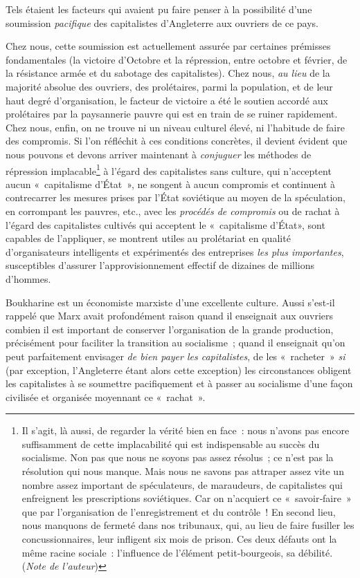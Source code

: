 \documentclass[french,twoside]{book} %
\begin{document}
\bigbreak
\noindent Tels étaient les facteurs qui avaient pu faire penser à la possibilité d’une soumission \emph{pacifique} des capitalistes d’Angleterre aux ouvriers de ce pays.\par
Chez nous, cette soumission est actuellement assurée par certaines prémisses fondamentales (la victoire d’Octobre et la répression, entre octobre et février, de la résistance armée et du sabotage des capitalistes). Chez nous, \emph{au lieu} de la majorité absolue des ouvriers, des prolétaires, parmi la population, et de leur haut degré d’organisation, le facteur de victoire a été le soutien accordé aux prolétaires par la paysannerie pauvre qui est en train de se ruiner rapidement. Chez nous, enfin, on ne trouve ni un niveau culturel élevé, ni l’habitude de faire des compromis. Si l’on réfléchit à ces conditions concrètes, il devient évident que nous pouvons et devons arriver maintenant à \emph{conjuguer} les méthodes de répression implacable\footnote{Il s’agit, là aussi, de regarder la vérité bien en face : nous n’avons pas encore suffisamment de cette implacabilité qui est indispensable au succès du socialisme. Non pas que nous ne soyons pas assez résolus ; ce n’est pas la résolution qui nous manque. Mais nous ne savons pas attraper assez vite un nombre assez important de spéculateurs, de maraudeurs, de capitalistes qui enfreignent les prescriptions soviétiques. Car on n’acquiert ce « savoir‑faire » que par l’organisation de l’enregistrement et du contrôle ! En second lieu, nous manquons de fermeté dans nos tribunaux, qui, au lieu de faire fusiller les concussionnaires, leur infligent six mois de prison. Ces deux défauts ont la même racine sociale : l’influence de l’élément petit‑bourgeois, sa débilité. (\emph{Note de l’auteur})} à l’égard des capitalistes sans culture, qui n’acceptent aucun « capitalisme d’État », ne songent à aucun compromis et continuent à contrecarrer les mesures prises par l’État soviétique au moyen de la spéculation, en corrompant les pauvres, etc., avec les \emph{procédés de compromis} ou de rachat à l’égard des capitalistes cultivés qui acceptent le « capitalisme d’État», sont capables de l’appliquer, se montrent utiles au prolétariat en qualité d’organisateurs intelligents et expérimentés des entreprises \emph{les plus importantes}, susceptibles d’assurer l’approvisionnement effectif de dizaines de millions d’hommes.\par
Boukharine est un économiste marxiste d’une excellente culture. Aussi s’est‑il rappelé que Marx avait profondément raison quand il enseignait aux ouvriers combien il est important de conserver l’organisation de la grande production, précisément pour faciliter la transition au socialisme ; quand il enseignait qu’on peut parfaitement envi­sager \emph{de bien payer les capitalistes}, de les « racheter » \emph{si} (par exception, l’Angleterre étant alors cette exception) les circonstances obligent les capitalistes à se soumettre paci­fiquement et à passer au socialisme d’une façon civilisée et organisée moyennant ce \hspace{1em}« rachat ».\par
\end{document}
